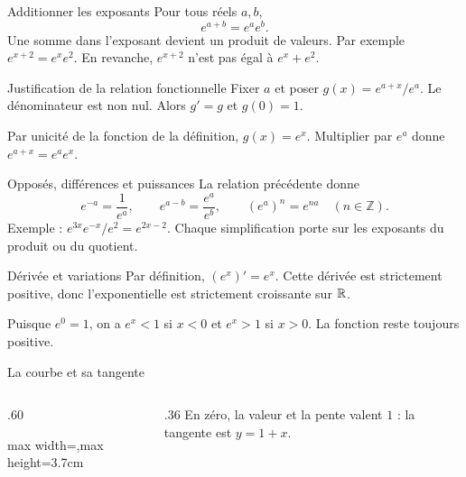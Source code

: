 \documentclass[aspectratio=169,12pt]{beamer}
\begin{document}
\renewcommand{\slidekind}{COMPRENDRE}
\begin{frame}[t,fragile]{Additionner les exposants}
Pour tous réels $a,b$,\[e^{a+b}=e^ae^b.\] Une somme dans l’exposant devient un produit de valeurs. Par exemple $e^{x+2}=e^xe^2$. En revanche, $e^{x+2}$ n’est pas égal à $e^x+e^2$.
\end{frame}
\renewcommand{\slidekind}{JUSTIFIER}
\begin{frame}[t,fragile]{Justification de la relation fonctionnelle}
Fixer $a$ et poser $g(x)=e^{a+x}/e^a$. Le dénominateur est non nul. Alors $g\prime=g$ et $g(0)=1$.\medskip\par Par unicité de la fonction de la définition, $g(x)=e^x$. Multiplier par $e^a$ donne $e^{a+x}=e^ae^x$.
\end{frame}
\renewcommand{\slidekind}{COMPRENDRE}
\begin{frame}[t,fragile]{Opposés, différences et puissances}
La relation précédente donne\[e^{-a}=\frac1{e^a},\qquad e^{a-b}=\frac{e^a}{e^b},\qquad(e^a)^n=e^{na}\quad(n\in\mathbb Z).\] Exemple : $e^{3x}e^{-x}/e^2=e^{2x-2}$. Chaque simplification porte sur les exposants du produit ou du quotient.
\end{frame}
\renewcommand{\slidekind}{COMPRENDRE}
\begin{frame}[t,fragile]{Dérivée et variations}
Par définition, $(e^x)\prime=e^x$. Cette dérivée est strictement positive, donc l’exponentielle est strictement croissante sur $\mathbb{R}$.\medskip\par Puisque $e^0=1$, on a $e^x<1$ si $x<0$ et $e^x>1$ si $x>0$. La fonction reste toujours positive.
\end{frame}
\renewcommand{\slidekind}{COMPRENDRE}
\begin{frame}[t,fragile]{La courbe et sa tangente}
\begin{columns}[c,onlytextwidth]\begin{column}{.60\textwidth}\centering\begin{adjustbox}{max width=\linewidth,max height=3.7cm}\end{adjustbox}\end{column}\begin{column}{.36\textwidth} En zéro, la valeur et la pente valent $1$ : la tangente est $y=1+x$.\end{column}\end{columns}
\end{frame}
\end{document}
